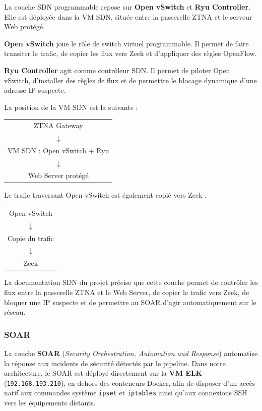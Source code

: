 \documentclass[12pt,a4paper,oneside]{report}
\begin{document}
	La couche SDN programmable repose sur \textbf{Open vSwitch} et \textbf{Ryu Controller}. Elle est déployée dans la VM SDN, située entre la passerelle ZTNA et le serveur Web protégé.
	
	\textbf{Open vSwitch} joue le rôle de switch virtuel programmable. Il permet de faire transiter le trafic, de copier les flux vers Zeek et d'appliquer des règles OpenFlow.
	
	\textbf{Ryu Controller} agit comme contrôleur SDN. Il permet de piloter Open vSwitch, d'installer des règles de flux et de permettre le blocage dynamique d'une adresse IP suspecte.
	
	La position de la VM SDN est la suivante :
	
	\begin{center}
		\begin{tabular}{c}
			ZTNA Gateway \\
			$\downarrow$ \\
			VM SDN : Open vSwitch + Ryu \\
			$\downarrow$ \\
			Web Server protégé \\
		\end{tabular}
	\end{center}
	
	Le trafic traversant Open vSwitch est également copié vers Zeek :
	
	\begin{center}
		\begin{tabular}{c}
			Open vSwitch \\
			$\downarrow$ \\
			Copie du trafic \\
			$\downarrow$ \\
			Zeek \\
		\end{tabular}
	\end{center}
	
	La documentation SDN du projet précise que cette couche permet de contrôler les flux entre la passerelle ZTNA et le Web Server, de copier le trafic vers Zeek, de bloquer une IP suspecte et de permettre au SOAR d'agir automatiquement sur le réseau.
	
	\subsubsection{SOAR}
	
	La couche \textbf{SOAR} (\textit{Security Orchestration, Automation and Response}) automatise
	la réponse aux incidents de sécurité détectés par le pipeline. Dans notre architecture, le
	SOAR est déployé directement sur la \textbf{VM ELK} (\texttt{192.168.193.210}), en dehors
	des conteneurs Docker, afin de disposer d'un accès natif aux commandes système
	\texttt{ipset} et \texttt{iptables} ainsi qu'aux connexions SSH vers les équipements distants.
	
\end{document}
